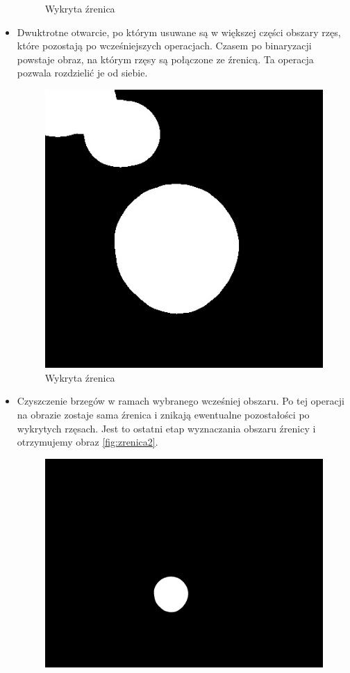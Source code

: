 \begin{itemize}
\begin{figure}
\begin{center}
\caption{Wykryta źrenica}
\label{fig:zamkniecie2}
\end{center}
\end{figure}
\item Dwuktrotne otwarcie, po którym usuwane są w większej części obszary rzęs, które pozostają po wcześniejszych operacjach. Czasem po binaryzacji powstaje obraz, na którym rzęsy są połączone ze źrenicą. Ta operacja pozwala rozdzielić je od siebie.
\begin{figure}
\begin{center}
\includegraphics[scale=0.5]{otwarcie2.jpg}
\caption{Wykryta źrenica}
\label{fig:otwarcie2}
\end{center}
\end{figure}
\item Czyszczenie brzegów w ramach wybranego wcześniej obszaru. Po tej operacji na obrazie zostaje sama źrenica i znikają ewentualne pozostałości po wykrytych rzęsach. Jest to ostatni etap wyznaczania obszaru źrenicy i otrzymujemy obraz \ref{fig:zrenica2}.
\begin{figure}
\begin{center}
\includegraphics[scale=0.5]{zrenica2.jpg}

\end{center}
\end{figure}
\end{itemize}
